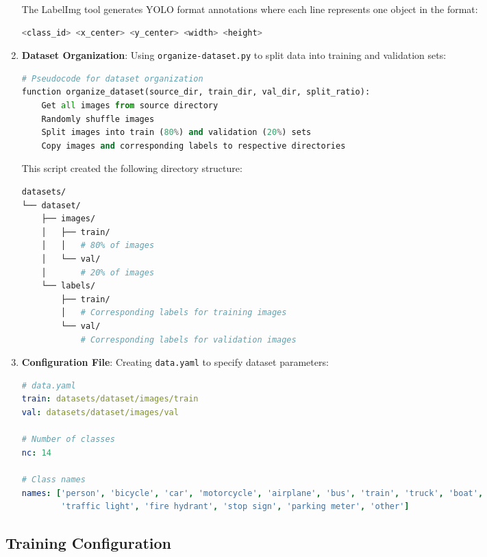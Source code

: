 \documentclass[9pt,a4paper,twoside]{rho-class/rho}
\begin{document}
\begin{enumerate}
        The LabelImg tool generates YOLO format annotations where each line represents one object in the format:
        \begin{lstlisting}[caption=YOLO annotation format, language=bash]
<class_id> <x_center> <y_center> <width> <height>
        \end{lstlisting}
        
        \item \textbf{Dataset Organization}: Using \texttt{organize-dataset.py} to split data into training and validation sets:
        \begin{lstlisting}[caption=Pseudocode for dataset organization, language=Python]
# Pseudocode for dataset organization
function organize_dataset(source_dir, train_dir, val_dir, split_ratio):
    Get all images from source directory
    Randomly shuffle images
    Split images into train (80%) and validation (20%) sets
    Copy images and corresponding labels to respective directories
        \end{lstlisting}
        
        This script created the following directory structure:
        \begin{lstlisting}[caption=Dataset directory structure, language=bash]
datasets/
└── dataset/
    ├── images/
    │   ├── train/  
    │   │   # 80% of images
    │   └── val/    
    │       # 20% of images
    └── labels/
        ├── train/  
        │   # Corresponding labels for training images
        └── val/    
            # Corresponding labels for validation images
        \end{lstlisting}
        
        \item \textbf{Configuration File}: Creating \texttt{data.yaml} to specify dataset parameters:
        \begin{lstlisting}[caption=data.yaml configuration, language=yaml]
# data.yaml
train: datasets/dataset/images/train
val: datasets/dataset/images/val

# Number of classes
nc: 14

# Class names
names: ['person', 'bicycle', 'car', 'motorcycle', 'airplane', 'bus', 'train', 'truck', 'boat', 
        'traffic light', 'fire hydrant', 'stop sign', 'parking meter', 'other']
        \end{lstlisting}
    \end{enumerate}
    
    \subsection{Training Configuration}
    
\end{document}
